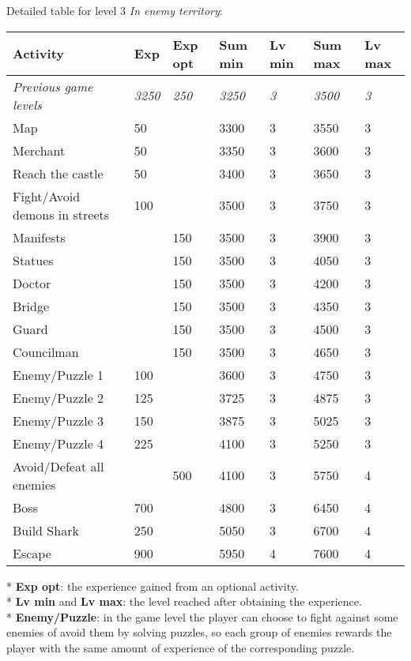 Detailed table for level 3 \textit{In enemy territory}:
\begin{table}[H]
\centering
\begin{tabular}{|p{3cm}|l|l|l|l|l|l|}
\hline
\rowcolor[HTML]{C0C0C0} 
\textbf{Activity} & \textbf{Exp} & \textbf{Exp opt} & \textbf{Sum min} & \textbf{Lv min} & \textbf{Sum max} & \textbf{Lv max} \\ \hline
\textit{Previous game levels} & \textit{3250} & \textit{250} & \textit{3250} & \textit{3} & \textit{3500} & \textit{3} \\ \hline
Map & 50 &  & 3300 & 3 & 3550 & 3 \\ \hline
Merchant & 50 &  & 3350 & 3 & 3600 & 3 \\ \hline
Reach the castle & 50 &  & 3400 & 3 & 3650 & 3 \\ \hline
Fight/Avoid demons in streets & 100 &  & 3500 & 3 & 3750 & 3 \\ \hline
Manifests &  & 150 & 3500 & 3 & 3900 & 3 \\ \hline
Statues &  & 150 & 3500 & 3 & 4050 & 3 \\ \hline
Doctor &  & 150 & 3500 & 3 & 4200 & 3 \\ \hline
Bridge &  & 150 & 3500 & 3 & 4350 & 3 \\ \hline
Guard &  & 150 & 3500 & 3 & 4500 & 3 \\ \hline
Councilman &  & 150 & 3500 & 3 & 4650 & 3 \\ \hline
Enemy/Puzzle 1 & 100 &  & 3600 & 3 & 4750 & 3 \\ \hline
Enemy/Puzzle 2 & 125 &  & 3725 & 3 & 4875 & 3 \\ \hline
Enemy/Puzzle 3 & 150 &  & 3875 & 3 & 5025 & 3 \\ \hline
Enemy/Puzzle 4 & 225 &  & 4100 & 3 & 5250 & 3 \\ \hline
Avoid/Defeat all enemies &  & 500 & 4100 & 3 & 5750 & 4 \\ \hline
Boss & 700 &  & 4800 & 3 & 6450 & 4 \\ \hline
Build Shark & 250 &  & 5050 & 3 & 6700 & 4 \\ \hline
Escape & 900 &  & 5950 & 4 & 7600 & 4 \\ \hline
\end{tabular}
\end{table}
* \textbf{Exp opt}: the experience gained from an optional activity. \\
* \textbf{Lv min} and \textbf{Lv max}: the level reached after obtaining the experience. \\
* \textbf{Enemy/Puzzle}: in the game level the player can choose to fight against some enemies of avoid them by solving puzzles, so each group of enemies rewards the player with the same amount of experience of the corresponding puzzle.
